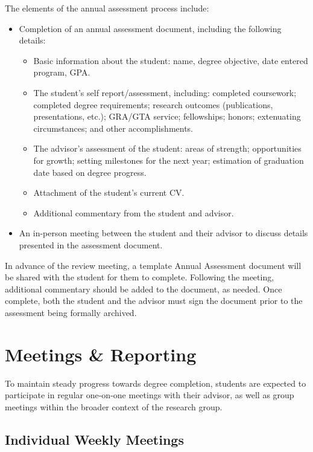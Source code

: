 \documentclass[12pt,a4paper,article,oneside]{memoir} %
\begin{document}
The elements of the annual assessment process include:
\begin{itemize}
\item Completion of an annual assessment document, including the following details:
\begin{itemize}
\item Basic information about the student: name, degree objective, date entered program, GPA.
\item The student's self report/assessment, including: completed coursework; completed degree requirements; research outcomes (publications, presentations, etc.); GRA/GTA service; fellowships; honors; extenuating circumstances; and other accomplishments.
\item The advisor's assessment of the student: areas of strength; opportunities for growth; setting milestones for the next year; estimation of graduation date based on degree progress.
\item Attachment of the student's current CV.
\item Additional commentary from the student and advisor.
\end{itemize}
\item An in-person meeting between the student and their advisor to discuss details presented in the assessment document.
\end{itemize}
In advance of the review meeting, a template Annual Assessment document will be shared with the student for them to complete. Following the meeting, additional commentary should be added to the document, as needed. Once complete, both the student and the advisor must sign the document prior to the assessment being formally archived.


\section{Meetings \& Reporting}

To maintain steady progress towards degree completion, students are expected to participate in regular one-on-one meetings with their advisor, as well as group meetings within the broader context of the research group.

\subsection{Individual Weekly Meetings}
\end{document}
